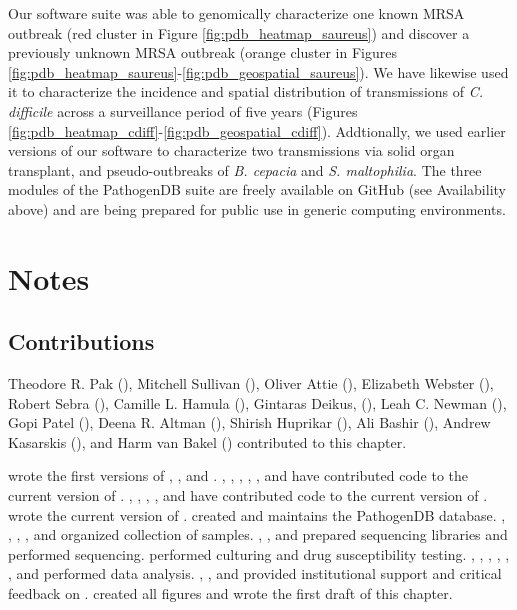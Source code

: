Our software suite was able to genomically characterize one known MRSA outbreak (red cluster in Figure \ref{fig:pdb_heatmap_saureus}) and discover a previously unknown MRSA outbreak (orange cluster in Figures \ref{fig:pdb_heatmap_saureus}-\ref{fig:pdb_geospatial_saureus}). We have likewise used it to characterize the incidence and spatial distribution of transmissions of \emph{C. difficile} across a surveillance period of five years (Figures \ref{fig:pdb_heatmap_cdiff}-\ref{fig:pdb_geospatial_cdiff}). Addtionally, we used earlier versions of our software to characterize two transmissions via solid organ transplant,\autocite{Altman2014,Bashir2017} and pseudo-outbreaks of \emph{B. cepacia} and \emph{S. maltophilia}.\autocite{Pak2015a} The three modules of the PathogenDB suite are freely available on GitHub (see Availability above) and are being prepared for public use in generic computing environments.

\section*{Notes}

\subsection*{Contributions}

Theodore R. Pak (), Mitchell Sullivan (), Oliver Attie (), Elizabeth Webster (), Robert Sebra (), Camille L. Hamula (), Gintaras Deikus, (), Leah C. Newman (), Gopi Patel (), Deena R. Altman (), Shirish Huprikar (), Ali Bashir (), Andrew Kasarskis (), and Harm van Bakel () contributed to this chapter. 

 wrote the first versions of \pathogendbpipeline, \pathogendbcomparison, and \pathogendbviz. , , , , , and  have contributed code to the current version of \pathogendbpipeline. , , , , and  have contributed code to the current version of \pathogendbcomparison.  wrote the current version of \pathogendbviz.  created and maintains the PathogenDB database. , , , , and  organized collection of samples. , , and  prepared sequencing libraries and performed sequencing.  performed culturing and drug susceptibility testing. , , , , , , and  performed data analysis. , , and  provided institutional support and critical feedback on \pathogendbviz.  created all figures and wrote the first draft of this chapter.

